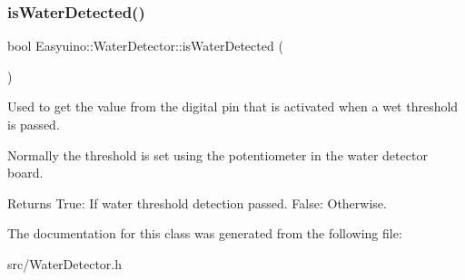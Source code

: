 \subsubsection{\texorpdfstring{is\+Water\+Detected()}{isWaterDetected()}}
{\footnotesize\ttfamily bool Easyuino\+::\+Water\+Detector\+::is\+Water\+Detected (\begin{DoxyParamCaption}{ }\end{DoxyParamCaption})}



Used to get the value from the digital pin that is activated when a wet threshold is passed. 

Normally the threshold is set using the potentiometer in the water detector board. \begin{DoxyReturn}{Returns}
True\+: If water threshold detection passed. False\+: Otherwise. 
\end{DoxyReturn}


The documentation for this class was generated from the following file\+:\begin{DoxyCompactItemize}
\item 
src/Water\+Detector.\+h\end{DoxyCompactItemize}
